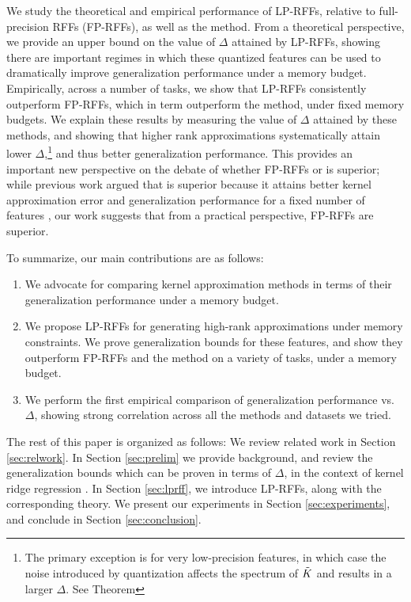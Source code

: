 We study the theoretical and empirical performance of LP-RFFs, relative to full-precision RFFs (FP-RFFs), as well as the \Nystrom method. From a theoretical perspective, we provide an upper bound on the value of $\Delta$ attained by LP-RFFs, showing there are important regimes in which these quantized features can be used to dramatically improve generalization performance under a memory budget. Empirically, across a number of tasks, we show that LP-RFFs consistently outperform FP-RFFs, which in term outperform the \Nystrom method, under fixed memory budgets. We explain these results by measuring the value of $\Delta$ attained by these methods, and showing that higher rank approximations systematically attain lower $\Delta$,\footnote{The primary exception is for very low-precision features, in which case the noise introduced by quantization affects the spectrum of $\tilde{K}$ and results in a larger $\Delta$.  See Theorem } and thus better generalization performance. This provides an important new perspective on the debate of whether FP-RFFs or \Nystrom is superior; while previous work argued that \Nystrom is superior because it attains better kernel approximation error and generalization performance for a fixed number of features \citep{nysvsrff12}, our work suggests that from a practical perspective, FP-RFFs are superior.  

To summarize, our main contributions are as follows:
\begin{enumerate}
	\item We advocate for comparing kernel approximation methods in terms of their generalization performance under a memory budget.
	\item We propose LP-RFFs for generating high-rank approximations under memory constraints.  We prove generalization bounds for these features, and show they outperform FP-RFFs and the \Nystrom method on a variety of tasks, under a memory budget.
	\item We perform the first empirical comparison of generalization performance vs. $\Delta$, showing strong correlation across all the methods and datasets we tried.
\end{enumerate}

The rest of this paper is organized as follows: We review related work in Section \ref{sec:relwork}.  In Section \ref{sec:prelim} we provide background, and review the generalization bounds which can be proven in terms of $\Delta$, in the context of kernel ridge regression \citep{avron17}.  In Section \ref{sec:lprff}, we introduce LP-RFFs, along with the corresponding theory.  We present our experiments in Section \ref{sec:experiments}, and conclude in Section \ref{sec:conclusion}.

